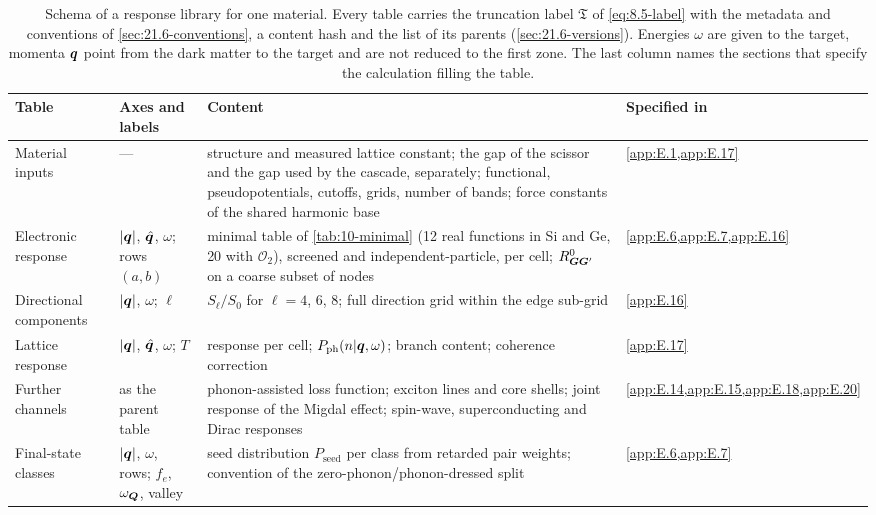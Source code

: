 \begin{table}[tbp]
  \caption{Schema of a response library for one material. Every table carries the truncation label $\mathfrak{T}$ of \cref{eq:8.5-label} with the metadata and conventions of \cref{sec:21.6-conventions}, a content hash and the list of its parents (\cref{sec:21.6-versions}). Energies $\omega$ are given to the target, momenta $\bm{q}$ point from the dark matter to the target and are not reduced to the first zone. The last column names the sections that specify the calculation filling the table.}
  \label{tab:21-schema}
  \centering\footnotesize
  \begin{tabular}{@{}>{\raggedright\arraybackslash}p{2.1cm}>{\raggedright\arraybackslash}p{2.8cm}>{\raggedright\arraybackslash}p{6.6cm}>{\raggedright\arraybackslash}p{2.5cm}@{}}
    \toprule
    Table & Axes and labels & Content & Specified in \\
    \midrule
    Material inputs & --- & structure and measured lattice constant; the gap of the scissor and the gap used by the cascade, separately; functional, pseudopotentials, cutoffs, grids, number of bands; force constants of the shared harmonic base & \cref{app:E.1,app:E.17} \\
    Electronic response & $|\bm{q}|$, $\hat{\bm{q}}$, $\omega$; rows $(a,b)$ & minimal table of \cref{tab:10-minimal} (12 real functions in Si and Ge, 20 with $\mathcal{O}_2$), screened and independent-particle, per cell; $R^0_{\bm{G}\bm{G}'}$ on a coarse subset of nodes & \cref{app:E.6,app:E.7,app:E.16} \\
    Directional components & $|\bm{q}|$, $\omega$; $\ell$ & $S_\ell/S_0$ for $\ell = 4$, 6, 8; full direction grid within the edge sub-grid & \cref{app:E.16} \\
    Lattice response & $|\bm{q}|$, $\hat{\bm{q}}$, $\omega$; $T$ & response per cell; $P_{\mathrm{ph}}(n|\bm{q},\omega)$; branch content; coherence correction & \cref{app:E.17} \\
    Further channels & as the parent table & phonon-assisted loss function; exciton lines and core shells; joint response of the Migdal effect; spin-wave, superconducting and Dirac responses & \cref{app:E.14,app:E.15,app:E.18,app:E.20} \\
    Final-state classes & $|\bm{q}|$, $\omega$, rows; $f_e$, $\omega_{\bm{Q}}$, valley & seed distribution $P_{\mathrm{seed}}$ per class from retarded pair weights; convention of the zero-phonon/phonon-dressed split & \cref{app:E.6,app:E.7} \\

\end{tabular}
\end{table}
